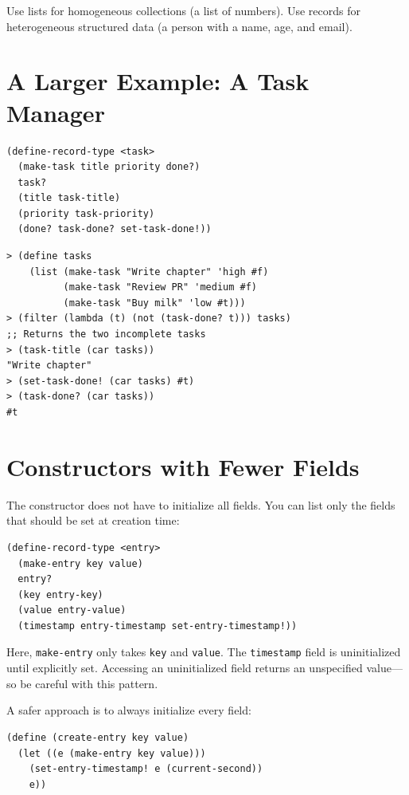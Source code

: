 Use lists for homogeneous collections (a list of numbers). Use records for heterogeneous structured data (a person with a name, age, and email).

\section{A Larger Example: A Task Manager}

\begin{lstlisting}
(define-record-type <task>
  (make-task title priority done?)
  task?
  (title task-title)
  (priority task-priority)
  (done? task-done? set-task-done!))
\end{lstlisting}

\begin{lstlisting}[style=repl]
> (define tasks
    (list (make-task "Write chapter" 'high #f)
          (make-task "Review PR" 'medium #f)
          (make-task "Buy milk" 'low #t)))
> (filter (lambda (t) (not (task-done? t))) tasks)
;; Returns the two incomplete tasks
> (task-title (car tasks))
"Write chapter"
> (set-task-done! (car tasks) #t)
> (task-done? (car tasks))
#t
\end{lstlisting}

\section{Constructors with Fewer Fields}

The constructor does not have to initialize all fields. You can list only the fields that should be set at creation time:

\begin{lstlisting}
(define-record-type <entry>
  (make-entry key value)
  entry?
  (key entry-key)
  (value entry-value)
  (timestamp entry-timestamp set-entry-timestamp!))
\end{lstlisting}

Here, \texttt{make-entry} only takes \texttt{key} and \texttt{value}. The \texttt{timestamp} field is uninitialized until explicitly set. Accessing an uninitialized field returns an unspecified value---so be careful with this pattern.

A safer approach is to always initialize every field:

\begin{lstlisting}
(define (create-entry key value)
  (let ((e (make-entry key value)))
    (set-entry-timestamp! e (current-second))
    e))
\end{lstlisting}

